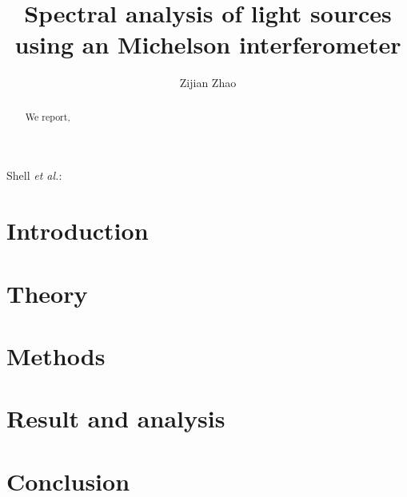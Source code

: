 \documentclass[journal]{Imperial_lab_report}
\begin{document}
\title{Spectral analysis of light sources using an Michelson interferometer}

\author{Zijian Zhao}%

%
{Shell \MakeLowercase{\textit{et al.}}:}

\maketitle


\begin{abstract}

We report, 
\end{abstract}


\section{Introduction}



\section{Theory}
\label{theory}


\section{Methods}
\label{methods}

\section{Result and analysis}
\label{analysis}
\section{Conclusion}
\label{Conclusion}




% 
\end{document}
